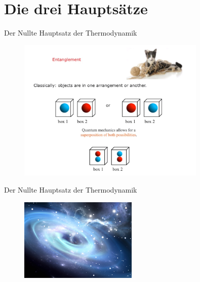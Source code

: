 \documentclass[PHONON = true, screen, ngerman]{beamer}
\begin{document}
	\section{Die drei Hauptsätze}
	\begin{frame}{Der Nullte Hauptsatz der Thermodynamik}	
		\begin{figure} [h] 
			\begin{center}
				\includegraphics[width=0.8\textwidth]{entanglement}
			\end{center}
		\end{figure} 	%
	\end{frame}
	\begin{frame}{Der Nullte Hauptsatz der Thermodynamik}
		\begin{figure} [h] 
			\begin{center}
				\includegraphics[width=0.5\textwidth]{Hawkingstrahlung}
			\end{center}
		\end{figure} %
	\end{frame}
	
\end{document}
